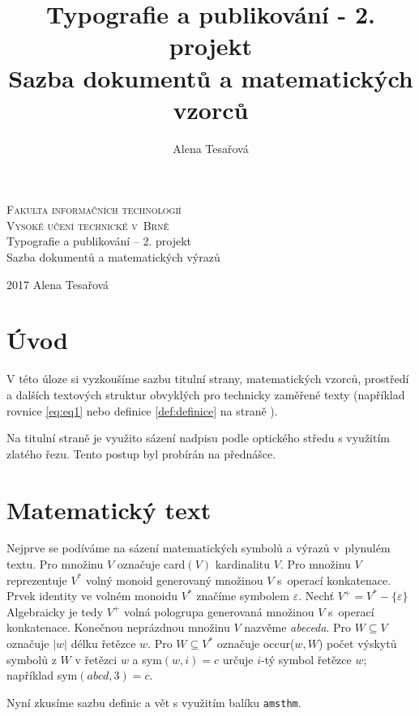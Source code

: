 \documentclass[11pt,twocolumn,a4paper]{article}
\author{Alena Tesařová}
\title{Typografie a publikování - 2. projekt \\
		Sazba dokumentů a matematických vzorců \\}
\theoremstyle{definition}
\begin{document}
\begin{titlepage}
\begin{center}
\Huge
\textsc{Fakulta informačních technologií\\
Vysoké učení technické v~Brně}\\
\LARGE Typografie a publikování – 2. projekt\\
Sazba dokumentů a matematických výrazů
\end{center}
{\Large 2017 \hfill
Alena Tesařová}
\end{titlepage}

\section*{Úvod}

V této úloze si vyzkoušíme sazbu titulní strany, matematických vzorců, prostředí a dalších textových struktur obvyklých pro technicky zaměřené texty (například rovnice \eqref{eq:eq1} nebo definice \ref{def:definice} na straně \pageref{def:definice}).

Na titulní straně je využito sázení nadpisu podle optického středu s využitím zlatého řezu. Tento postup byl probírán na přednášce.


\section{Matematický text}

Nejprve se podíváme na sázení matematických symbolů a výrazů v~plynulém textu. Pro množinu $V$ označuje card$(V)$ kardinalitu $V$.
Pro množinu $V$ reprezentuje $V^*$ volný monoid generovaný množinou $V$ s~operací konkatenace.
Prvek identity ve volném monoidu $V^*$ značíme symbolem $\varepsilon.$
Nechť $V^+ = V^* - \{\varepsilon\}$ Algebraicky je tedy $V^+$ volná pologrupa generovaná množinou $V$ s~operací konkatenace.
Konečnou neprázdnou množinu $V$ nazvěme \textit{abeceda}.
Pro $W \subseteq V$ označuje $|w|$ délku řetězce $w$. Pro $W \subseteq V^*$ označuje occur($w,W$) počet výskytů symbolů z $W$ v řetězci $w$ a sym$(w, i) = c$ určuje $i$-tý symbol řetězce $w$; například sym$(abcd,3) = c$.

Nyní zkusíme sazbu definic a vět s využitím balíku \texttt{amsthm}.
\end{document}
